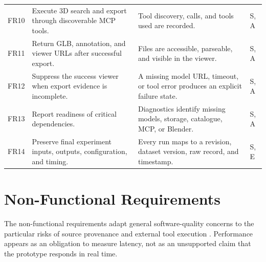 {\begin{table}[htbp]
\begin{tabularx}{\textwidth}{L{0.07\textwidth} Y Y L{0.11\textwidth}}
    FR10 &
    Execute 3D search and export through discoverable MCP tools. &
    Tool discovery, calls, and tools used are recorded. &
    S, A \\

    FR11 &
    Return GLB, annotation, and viewer URLs after successful export. &
    Files are accessible, parseable, and visible in the viewer. &
    S, A \\

    FR12 &
    Suppress the success viewer when export evidence is incomplete. &
    A missing model URL, timeout, or tool error produces an explicit failure state. &
    S, A \\

    FR13 &
    Report readiness of critical dependencies. &
    Diagnostics identify missing models, storage, catalogue, MCP, or Blender. &
    S, A \\

    FR14 &
    Preserve final experiment inputs, outputs, configuration, and timing. &
    Every run maps to a revision, dataset version, raw record, and timestamp. &
    S, E \\
    \bottomrule
  \end{tabularx}
\end{table}
}

\section{Non-Functional Requirements}
\label{sec:nonfunctional-requirements}

The non-functional requirements adapt general software-quality concerns to the particular risks of source provenance and external tool execution \parencite{iso25010}. Performance appears as an obligation to measure latency, not as an unsupported claim that the prototype responds in real time.

